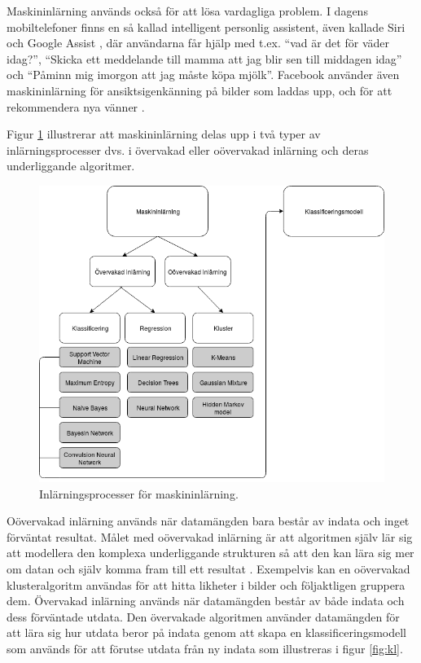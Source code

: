 \documentclass{kaumasters} %
\begin{document}
Maskininlärning används också för att lösa vardagliga problem. I dagens mobiltelefoner finns en så kallad intelligent personlig assistent, även kallade Siri \cite{siri} och Google Assist \cite{google},  där användarna får hjälp med t.ex. “vad är det för väder idag?”, “Skicka ett meddelande till mamma att jag blir sen till middagen idag” och “Påminn mig imorgon att jag måste köpa mjölk”. Facebook använder även maskininlärning för ansiktsigenkänning \cite{facebook:001} på bilder som laddas upp, och för att rekommendera nya vänner \cite{facebook:002}. 

Figur \ref{fig:ml} illustrerar att maskininlärning delas upp i två typer av inlärningsprocesser dvs. i övervakad eller oövervakad inlärning och deras underliggande algoritmer.
\begin{figure}[h]
\includegraphics[width=12cm]{ml}
\centering
\caption{Inlärningsprocesser för maskininlärning.}
\label{fig:ml}
\end{figure}

Oövervakad inlärning används när datamängden bara består av indata och inget förväntat resultat. Målet med oövervakad inlärning är att algoritmen själv lär sig att modellera den komplexa underliggande strukturen så att den kan lära sig mer om datan och själv komma fram till ett resultat \cite{wiki:007}. Exempelvis kan en oövervakad klusteralgoritm användas för att hitta likheter i bilder och följaktligen gruppera dem.
Övervakad inlärning används när datamängden består av både indata och dess förväntade utdata. Den övervakade algoritmen använder datamängden för att lära sig hur utdata beror på indata genom att skapa en klassificeringsmodell som används för att förutse utdata från ny indata som illustreras i figur \ref{fig:kl}. 
\end{document}
